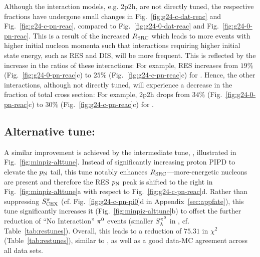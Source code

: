 Although the interaction models, e.g. 2p2h, are not directly tuned, the respective fractions have undergone small changes in Fig.~\ref{fig:g24-c-dat-reac} and Fig.~\ref{fig:g24-c-pn-reac}, compared to Fig.~\ref{fig:g24-0-dat-reac} and Fig.~\ref{fig:g24-0-pn-reac}. 
This is a result of the increased $R_\textrm{SRC}$ which leads to more events with higher initial nucleon momenta such that interactions requiring higher initial state energy, such as RES and DIS, will be more frequent. 
This is reflected by the increase in the ratios of these interactions: For example, RES increases from $19\%$ (Fig.~\ref{fig:g24-0-pn-reac}c) to $25\%$ (Fig.~\ref{fig:g24-c-pn-reac}c) for \minzpi. 
Hence, the other interactions, although not directly tuned, will experience a decrease in the fraction of total cross section: For example, 2p2h drops from $34\%$ (Fig.~\ref{fig:g24-0-pn-reac}c) to $30\%$ (Fig.~\ref{fig:g24-c-pn-reac}c) for \minzpi.



\subsection{Alternative tune: \gT}

A similar improvement is achieved by the intermediate tune, \gT, illustrated in Fig.~\ref{fig:minpiz-alttune}. Instead of significantly increasing proton PIPD to elevate the $p_\textrm{N}$ tail, this tune notably enhances $R_\textrm{SRC}$---more-energetic nucleons are present and therefore the RES $p_\textrm{N}$ peak is shifted to the right in Fig.~\ref{fig:minpiz-alttune}a with respect to Fig.~\ref{fig:g24-c-pn-reac}d. Rather than suppressing $S_\textrm{CEX}^{\pi}$ (cf. Fig.~\ref{fig:g24-c-pn-pi0}d in Appendix~\ref{sec:appfate}), this tune significantly increases it (Fig.~\ref{fig:minpiz-alttune}b) to offset the further reduction of ``No Interaction'' $\pi^0$ events (smaller $S_\lambda^{\pi^{0}}$ in \allpar, cf. Table~\ref{tab:restunes}).  Overall, this leads to a reduction of $75.31$ in $\chi^2$ (Table~\ref{tab:restunes}), similar to \gC, as well as a good data-MC agreement across all data sets. 


